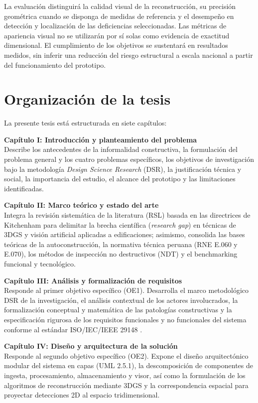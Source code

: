 \documentclass[12pt,oneside]{report}
\begin{document}
La evaluación distinguirá la calidad visual de la reconstrucción, su precisión geométrica cuando se disponga de medidas de referencia y el desempeño en detección y localización de las deficiencias seleccionadas. Las métricas de apariencia visual no se utilizarán por sí solas como evidencia de exactitud dimensional. El cumplimiento de los objetivos se sustentará en resultados medidos, sin inferir una reducción del riesgo estructural a escala nacional a partir del funcionamiento del prototipo.\par

\section{Organización de la tesis}
La presente tesis está estructurada en siete capítulos:

\textbf{Capítulo I: Introducción y planteamiento del problema} \\
Describe los antecedentes de la informalidad constructiva, la formulación del problema general y los cuatro problemas específicos, los objetivos de investigación bajo la metodología \textit{Design Science Research} (DSR), la justificación técnica y social, la importancia del estudio, el alcance del prototipo y las limitaciones identificadas.

\textbf{Capítulo II: Marco teórico y estado del arte} \\
Integra la revisión sistemática de la literatura (RSL) basada en las directrices de Kitchenham para delimitar la brecha científica (\textit{research gap}) en técnicas de 3DGS y visión artificial aplicadas a edificaciones; asimismo, consolida las bases teóricas de la autoconstrucción, la normativa técnica peruana (RNE E.060 y E.070), los métodos de inspección no destructivos (NDT) y el benchmarking funcional y tecnológico.

\textbf{Capítulo III: Análisis y formalización de requisitos} \\
Responde al primer objetivo específico (OE1). Desarrolla el marco metodológico DSR de la investigación, el análisis contextual de los actores involucrados, la formalización conceptual y matemática de las patologías constructivas y la especificación rigurosa de los requisitos funcionales y no funcionales del sistema conforme al estándar ISO/IEC/IEEE 29148 \citep{iso29148}.

\textbf{Capítulo IV: Diseño y arquitectura de la solución} \\
Responde al segundo objetivo específico (OE2). Expone el diseño arquitectónico modular del sistema en capas (UML 2.5.1), la descomposición de componentes de ingesta, procesamiento, almacenamiento y visor, así como la formulación de los algoritmos de reconstrucción mediante 3DGS y la correspondencia espacial para proyectar detecciones 2D al espacio tridimensional.
\end{document}

